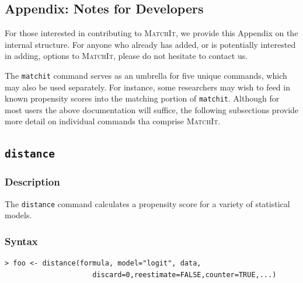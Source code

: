 \documentclass[oneside,letterpaper,titlepage]{article}
\newcommand{\MatchIt}{\textsc{MatchIt}}
\begin{document}
\begin{appendix}
\section{Appendix: Notes for Developers}
\label{reference}  
For those interested in contributing to \MatchIt, we provide this
Appendix on the internal structure.  For anyone who already has added,
or is potentially interested in adding, options to \MatchIt, please do not
hesitate to contact us.  

The \texttt{matchit} command serves as an umbrella for five
unique commands, which may also be used separately.  For instance,
some researchers may wish to feed in known propensity scores into the
matching portion of \texttt{matchit}.  Although for most users the
above documentation will suffice, the following subsections provide
more detail on individual commands tha comprise \MatchIt.

\subsection{\texttt{distance}}

\subsubsection{Description}
The \texttt{distance} command calculates a propensity score for a
variety of statistical models. 

\subsubsection{Syntax}
\begin{verbatim}
> foo <- distance(formula, model="logit", data,
                     discard=0,reestimate=FALSE,counter=TRUE,...)
\end{verbatim}


\end{appendix}
\end{document}
